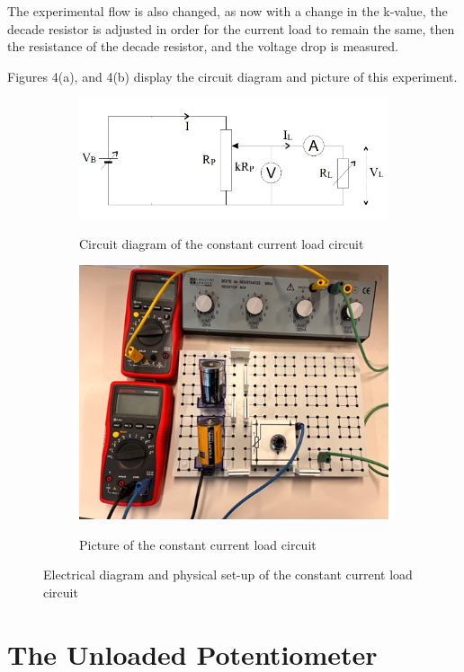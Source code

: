 \documentclass[a4paper]{article}
\begin{document}
The experimental flow is also changed, as now with a change in the k-value, the
decade resistor is adjusted in order for the current load to remain the same,
then the resistance of the decade resistor, and the voltage drop is measured.

Figures 4(a), and 4(b) display the circuit diagram and picture of this
experiment.

\begin{figure}[!ht]
    \centering
    \begin{subfigure}{.5\textwidth}
        \centering
        \includegraphics[width = 0.8\linewidth]{fixed current circuit.png}
        \label{fig:4a}
        \caption{Circuit diagram of the constant current load circuit\cite{report}}
        
    \end{subfigure}%
    \begin{subfigure}{.5\textwidth}
        \centering
        \includegraphics[width = 0.8\linewidth]{fixed currrent picture.png}
        \label{fig:4b}
        \caption{Picture of the constant current load circuit}
    \end{subfigure}
    \caption{Electrical diagram and physical set-up of the constant current load circuit}
\end{figure}
\section{The Unloaded Potentiometer}
\end{document}
